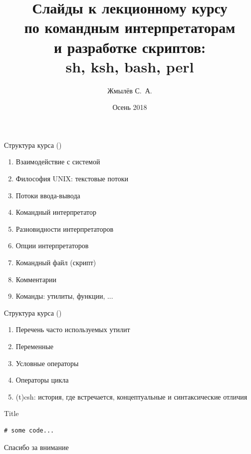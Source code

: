 \documentclass{beamer}
\title{\LARGE Слайды к лекционному курсу \\ по командным интерпретаторам \\
   и разработке скриптов: \\ sh, ksh, bash, perl}
\author{Жмылёв С.~А.}
\date{Осень 2018}
\begin{document}
 \Large

\begin{frame} \titlepage \end{frame}

\begin{frame}[fragile]{Структура курса ()}
\begin{enumerate}

\item Взаимодействие с системой
\item Философия UNIX: текстовые потоки
\item Потоки ввода-вывода
\item Командный интерпретатор
\item Разновидности интерпретаторов
\item Опции интерпретаторов
\item Командный файл (скрипт)
\item Комментарии
\item Команды: утилиты, функции, ...

\setcounter{TocEnum}{\value{enumi}}
\end{enumerate}
\end{frame}

\begin{frame}[fragile]{Структура курса ()}
\begin{enumerate} \setcounter{enumi}{\value{TocEnum}}

\item Перечень часто используемых утилит
\item Переменные
\item Условные операторы
\item Операторы цикла
\item (t)csh: история, где встречается, концептуальные и синтаксические отличия

\end{enumerate}
\end{frame}

\begin{frame}[fragile]{Title} \begin{lstlisting}
# some code...
\end{lstlisting} 
\end{frame}

\usebackgroundtemplate{}
\begin{frame}
   \centering \LARGE Спасибо за внимание
\end{frame}
\end{document}
